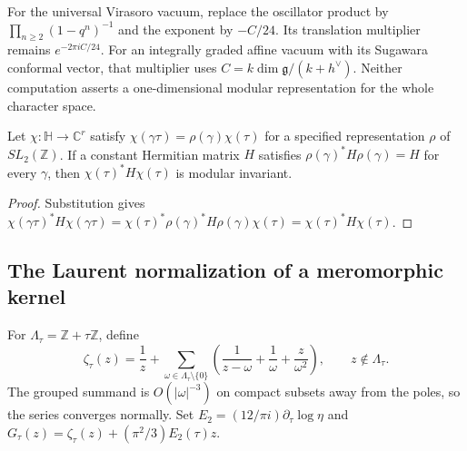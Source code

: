 For the universal Virasoro vacuum, replace the oscillator product by $\prod_{n\geq2}(1-q^n)^{-1}$ and the exponent by $-C/24$.
Its translation multiplier remains $e^{-2\pi iC/24}$.
For an integrally graded affine vacuum with its Sugawara conformal vector, that multiplier uses $C=k\dim\mathfrak g/(k+h^\vee)$.
Neither computation asserts a one-dimensional modular representation for the whole character space.

\begin{proposition}
\label{thm:modular-classification}
Let $\chi:\mathbb H\to\mathbb C^r$ satisfy $\chi(\gamma\tau)=\rho(\gamma)\chi(\tau)$ for a specified representation $\rho$ of $SL_2(\mathbb Z)$.
If a constant Hermitian matrix $H$ satisfies $\rho(\gamma)^*H\rho(\gamma)=H$ for every $\gamma$, then $\chi(\tau)^*H\chi(\tau)$ is modular invariant.
\end{proposition}
\begin{proof}
Substitution gives $\chi(\gamma\tau)^*H\chi(\gamma\tau)=\chi(\tau)^*\rho(\gamma)^*H\rho(\gamma)\chi(\tau)=\chi(\tau)^*H\chi(\tau)$.
\end{proof}

\subsection{The Laurent normalization of a meromorphic kernel}

For $\Lambda_\tau=\mathbb Z+\tau\mathbb Z$, define
\[
 \zeta_\tau(z)=\frac1z+
 \sum_{\omega\in\Lambda_\tau\setminus\{0\}}
 \left(\frac1{z-\omega}+\frac1\omega+\frac z{\omega^2}\right),
 \qquad z\notin\Lambda_\tau.
\]
The grouped summand is $O(|\omega|^{-3})$ on compact subsets away from the poles, so the series converges normally.
Set $E_2=(12/\pi i)\partial_\tau\log\eta$ and
$G_\tau(z)=\zeta_\tau(z)+(\pi^2/3)E_2(\tau)z$.

